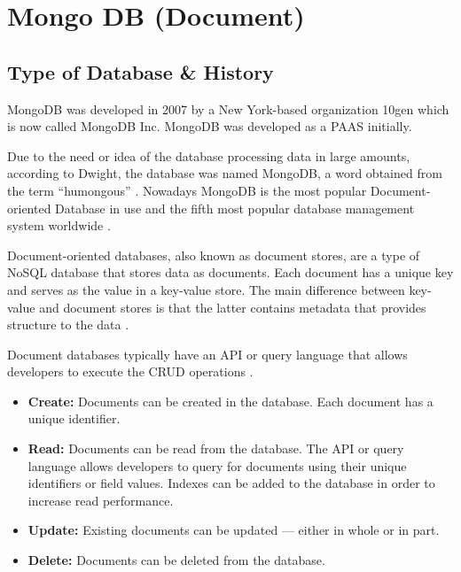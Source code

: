
\chapter{Mongo DB (Document)} \label{ch:mongo}

\section{Type of Database \& History}
MongoDB was developed in 2007 by a New York-based organization 10gen which is now called MongoDB Inc. MongoDB was developed as a \ac{PAAS} initially.

Due to the need or idea of the database processing data in large amounts, according to Dwight, the database was named MongoDB, a word obtained from the term \enquote{humongous} \parencite{mongodb-History}.
Nowadays MongoDB is the most popular Document-oriented Database in use and the fifth most popular database management system worldwide \parencite{mongodb-Statista}.

Document-oriented databases, also known as document stores, are a type of NoSQL database that stores data as documents. Each document has a unique key and serves as the value in a key-value store. The main difference between key-value and document stores is that the latter contains metadata that provides structure to the data \parencite{mongodb-Comparison}.

Document databases typically have an \ac{API} or query language that allows developers to execute the \ac{CRUD} operations \parencite{mongodb-mongo}.

\begin{itemize}
    \item \textbf{Create:} Documents can be created in the database. Each document has a unique identifier.
    \item \textbf{Read:} Documents can be read from the database. The \ac{API} or query language allows developers to query for documents using their unique identifiers or field values. Indexes can be added to the database in order to increase read performance.
    \item \textbf{Update:} Existing documents can be updated — either in whole or in part.
    \item \textbf{Delete:} Documents can be deleted from the database.
\end{itemize}

